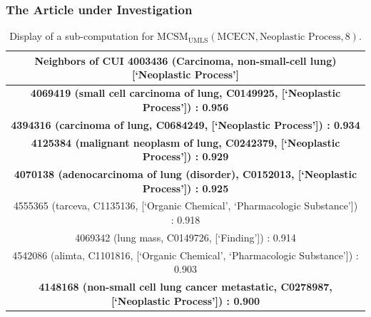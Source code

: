 \documentclass{beamer}
\newcommand\T{\rule{0pt}{2.6ex}}       %
\newcommand\B{\rule[-1.2ex]{0pt}{0pt}} %
\begin{document}
\begin{frame}
\frametitle{The Article under Investigation}
\begin{table}[h!]
\caption{\centering
\scriptsize Display of a sub-computation for$\text{ MCSM}_{\text{UMLS}}(\text{MCECN},\text{Neoplastic Process}, 8)$.}
{
\tiny
\begin{center}
\begin{tabular}{|c|}
\hline
Neighbors of CUI 4003436 (Carcinoma, non-small-cell lung) [`Neoplastic Process'] 
\T \B \\ 
\hline
\textbf{4069419 (small cell carcinoma of lung, C0149925,  [`Neoplastic Process']) : 0.956} \T \B \\
\textbf{4394316 (carcinoma of lung, C0684249,  [`Neoplastic Process']) : 0.934} 
\T \B \\
\textbf{4125384 (malignant neoplasm of lung, C0242379,  [`Neoplastic Process']) : 0.929} \T \B \\
\textbf{4070138 (adenocarcinoma of lung (disorder), C0152013,  [`Neoplastic Process']) : 0.925} \T \B \\
4555365 (tarceva, C1135136,  [`Organic Chemical', `Pharmacologic Substance']) : 0.918 \T \B \\
4069342 (lung mass, C0149726,  [`Finding']) : 0.914 \T \B \\
4542086 (alimta, C1101816,  [`Organic Chemical', `Pharmacologic Substance']) : 0.903 \T \B \\
\textbf{4148168 (non-small cell lung cancer metastatic, C0278987,  [`Neoplastic Process']) : 0.900} \T \B \\
\hline
\end{tabular}
\end{center}
}
\end{table}
\end{frame}
\end{document}
